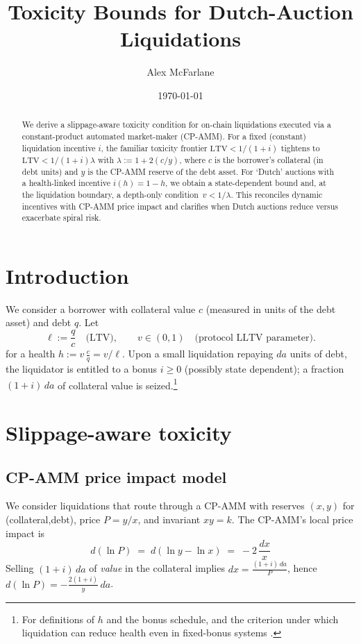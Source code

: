 \documentclass[11pt]{article}
\title{Toxicity Bounds for Dutch-Auction Liquidations}
\author{Alex McFarlane}
\date{\today}
\begin{document}
\maketitle

\begin{abstract}
We derive a slippage-aware toxicity condition for on-chain liquidations executed via a constant-product automated market-maker (CP-AMM). For a fixed (constant) liquidation incentive \(i\), the familiar toxicity frontier \( \mathrm{LTV} < 1/(1+i) \) tightens to
\(\mathrm{LTV} < 1/(1+i)\lambda\) with \(\lambda := 1 + 2(c/y)\), where \(c\) is the borrower’s collateral (in debt units) and \(y\) is the CP-AMM reserve of the debt asset. For `Dutch' auctions with a health-linked incentive \(i(h) = 1 - h\), we obtain a state-dependent bound and, at the liquidation boundary, a depth-only condition \( \,v < 1/\lambda\). This reconciles dynamic incentives with CP-AMM price impact and clarifies when Dutch auctions reduce versus exacerbate spiral risk.
\end{abstract}

\section{Introduction}
We consider a borrower with collateral value \(c\) (measured in units of the debt asset) and debt \(q\). Let
\[
\ell := \frac{q}{c} \quad \text{(LTV)}, 
\qquad v \in (0,1) \quad \text{(protocol LLTV parameter)}.
\]
for a health \( h := v\,\frac{c}{q} = v/\ell \). Upon a small liquidation repaying \(da\) units of debt, the liquidator is entitled to a bonus \(i \ge 0\) (possibly state dependent); a fraction \((1+i)\,da\) of collateral value is seized.\footnote{For definitions of \(h\) and the bonus schedule, and the criterion under which liquidation can reduce health even in fixed-bonus systems \cite{Bentley}.}

\section{Slippage-aware toxicity}

\subsection{CP-AMM price impact model}
We consider liquidations that route through a CP-AMM with reserves \((x,y)\) for (collateral,debt), price \(P=y/x\), and invariant \(xy=k\). The CP-AMM’s local price impact is
\begin{equation}
d(\ln P) \;=\; d(\ln y - \ln x) \;=\; -2\,\frac{dx}{x}
\label{eq:cp-impact}
\end{equation}
Selling \((1+i)\,da\) of \emph{value} in the collateral implies \(dx = \frac{(1+i)\,da}{P}\), hence \(d(\ln P) = -\frac{2(1+i)}{y}\,da\).
\end{document}
